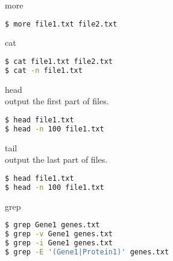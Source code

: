 \documentclass{beamer}
\begin{document}
\begin{frame}[fragile]
 \begin{center}
    \huge{more}\\
    \end{center}
\begin{lstlisting}[language=bash]
$ more file1.txt file2.txt
\end{lstlisting}
\end{frame}





\begin{frame}[fragile]
 \begin{center}
    \huge{cat}\\
    \end{center}
\begin{lstlisting}[language=bash]
$ cat file1.txt file2.txt
$ cat -n file1.txt
\end{lstlisting}
\end{frame}


\begin{frame}[fragile]
 \begin{center}
    \huge{head}\\
     output the first part of files.\\
    \end{center}
\begin{lstlisting}[language=bash]
$ head file1.txt
$ head -n 100 file1.txt
\end{lstlisting}
\end{frame}


\begin{frame}[fragile]
 \begin{center}
    \huge{tail}\\
     output the last part of files.\\
    \end{center}
\begin{lstlisting}[language=bash]
$ head file1.txt
$ head -n 100 file1.txt
\end{lstlisting}
\end{frame}



\begin{frame}[fragile]
 \begin{center}
    \huge{grep}\\
    \end{center}
\begin{lstlisting}[language=bash]
$ grep Gene1 genes.txt
$ grep -v Gene1 genes.txt
$ grep -i Gene1 genes.txt
$ grep -E '(Gene1|Protein1)' genes.txt
\end{lstlisting}
\end{frame}
\end{document}
